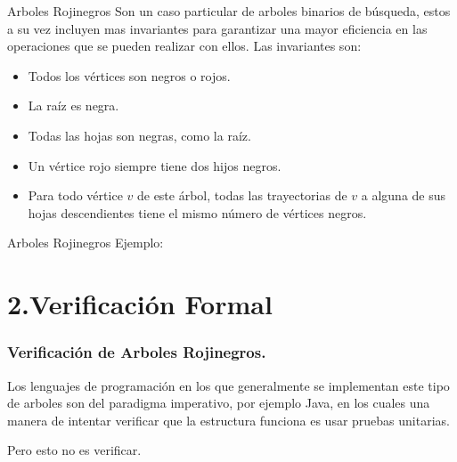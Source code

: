 \documentclass[xcolor=dvipsnames,table,handout]{beamer}
\begin{document}
\begin{frame}{Arboles Rojinegros}
Son un caso particular de arboles binarios de búsqueda, estos a su vez incluyen mas invariantes para garantizar una mayor eficiencia en las operaciones que se pueden realizar con ellos. Las invariantes son:
\begin{itemize}
    \item Todos los vértices son negros o rojos.
    \item La raíz es negra.
    \item Todas las hojas son negras, como la raíz.
    \item Un vértice rojo siempre tiene dos hijos negros.
    \item Para todo vértice $v$ de este árbol, todas las trayectorias de $v$ a alguna de sus hojas descendientes tiene el mismo número de vértices negros.
\end{itemize}

\end{frame}

\begin{frame}{Arboles Rojinegros}
Ejemplo:

\centering
\end{frame}


\section{2.Verificación Formal}

\begin{frame}
  \frametitle{Verificación de Arboles Rojinegros.}

  Los lenguajes de programación en los que generalmente se implementan este tipo de arboles son del paradigma imperativo, por ejemplo Java, en los cuales una manera de
  intentar verificar que la estructura funciona es usar pruebas unitarias.

\newline \newline \centering Pero esto no es verificar.

\end{frame}
\end{document}
